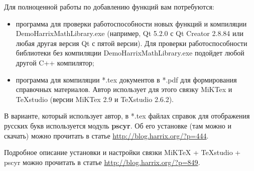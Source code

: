 Для полноценной работы по добавлению функций вам потребуются:
\begin{itemize}
\item программа для проверки работоспособности новых функций и компиляции DemoHarrixMathLibrary.exe (например, Qt 5.2.0 с Qt Creator 2.8.84 или любая другая версия Qt с пятой версии). Для проверки работоспособности библиотеки без компиляции DemoHarrixMathLibrary.exe подойдет любой другой C++ компилятор;
\item программа для компиляции *.tex документов в *.pdf для формирования справочных материалов. Автор использует для этого связку MiKTex и TeXstudio (версии MiKTex 2.9 и TeXstudio 2.6.2).
\end{itemize}

В варианте, который использует автор, в *.tex файлах справок для отображения русских букв используется модуль \textbf{pscyr}. Об его установке (там можно и скачать) можно прочитать в статье \href{http://blog.harrix.org/?p=444}{http://blog.harrix.org/?p=444}.

Подробное описание установки и настройки связки MiKTeX + TeXstudio + pscyr можно прочитать в статье \href{http://blog.harrix.org/?p=849}{http://blog.harrix.org/?p=849}.

